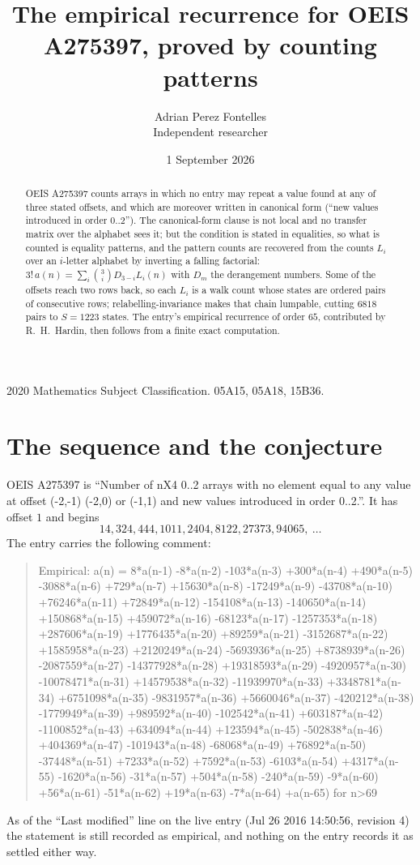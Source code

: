 \documentclass[11pt,a4paper]{article}
\title{The empirical recurrence for OEIS A275397, proved by counting patterns}
\author{Adrian Perez Fontelles\\ \small Independent researcher}
\date{1 September 2026}
\theoremstyle{plain}
\theoremstyle{definition}
\begin{document}
\maketitle

\begin{abstract}
OEIS A275397 counts arrays in which no entry may repeat a value found at any of three stated
offsets, and which are moreover written in canonical form (``new values introduced in order
$0..2$''). The canonical-form clause is not local and no transfer matrix over the
alphabet sees it; but the condition is stated in equalities, so what is counted is equality
patterns, and the pattern counts are recovered from the counts $L_i$ over an $i$-letter
alphabet by inverting a falling factorial:
$3!\,a(n)=\sum_i\binom{3}{i}D_{3-i}L_i(n)$ with $D_m$ the derangement numbers.
Some of the offsets reach two rows back, so each $L_i$ is a walk count whose states are
ordered pairs of consecutive rows; relabelling-invariance makes that chain lumpable,
cutting $6818$ pairs to $S=1223$ states. The entry's empirical recurrence of order $65$,
contributed by R.~H.~Hardin, then follows from a finite exact computation.
\end{abstract}

\noindent\small 2020 Mathematics Subject Classification. 05A15, 05A18, 15B36.\normalsize

\section{The sequence and the conjecture}

OEIS A275397 is ``Number of nX4 0..2 arrays with no element equal to any value at offset (-2,-1) (-2,0) or (-1,1) and new values introduced in order 0..2.''. It has offset $1$ and begins
\[
14, 324, 444, 1011, 2404, 8122, 27373, 94065,\ \dots
\]
The entry carries the following comment:
\begin{quote}\small
Empirical: a(n) = 8*a(n-1) -8*a(n-2) -103*a(n-3) +300*a(n-4) +490*a(n-5) -3088*a(n-6) +729*a(n-7) +15630*a(n-8) -17249*a(n-9) -43708*a(n-10) +76246*a(n-11) +72849*a(n-12) -154108*a(n-13) -140650*a(n-14) +150868*a(n-15) +459072*a(n-16) -68123*a(n-17) -1257353*a(n-18) +287606*a(n-19) +1776435*a(n-20) +89259*a(n-21) -3152687*a(n-22) +1585958*a(n-23) +2120249*a(n-24) -5693936*a(n-25) +8738939*a(n-26) -2087559*a(n-27) -14377928*a(n-28) +19318593*a(n-29) -4920957*a(n-30) -10078471*a(n-31) +14579538*a(n-32) -11939970*a(n-33) +3348781*a(n-34) +6751098*a(n-35) -9831957*a(n-36) +5660046*a(n-37) -420212*a(n-38) -1779949*a(n-39) +989592*a(n-40) -102542*a(n-41) +603187*a(n-42) -1100852*a(n-43) +634094*a(n-44) +123594*a(n-45) -502838*a(n-46) +404369*a(n-47) -101943*a(n-48) -68068*a(n-49) +76892*a(n-50) -37448*a(n-51) +7233*a(n-52) +7592*a(n-53) -6103*a(n-54) +4317*a(n-55) -1620*a(n-56) -31*a(n-57) +504*a(n-58) -240*a(n-59) -9*a(n-60) +56*a(n-61) -51*a(n-62) +19*a(n-63) -7*a(n-64) +a(n-65) for n>69
\end{quote}
As of the ``Last modified'' line on the live entry (Jul 26 2016 14:50:56, revision 4) the statement is
still recorded as empirical, and nothing on the entry records it as settled either way.
\end{document}
